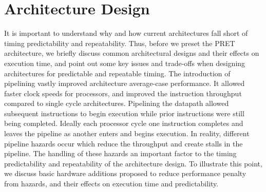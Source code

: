 \section{Architecture Design}
It is important to understand why and how current architectures fall short of timing predictability and repeatability.
Thus, before we preset the PRET architecture, we briefly discuss common architectural designs and their effects on execution time, and point out some key issues and trade-offs when designing architectures for predictable and repeatable timing.
The introduction of pipelining vastly improved architecture average-case performance.
It allowed faster clock speeds for processors, and improved the instruction throughput compared to single cycle architectures.
Pipelining the datapath allowed subsequent instructions to begin execution while prior instructions were still being completed. 
Ideally each processor cycle one instruction completes and leaves the pipeline as another enters and begins execution. 
In reality, different pipeline hazards occur which reduce the throughput and create stalls in the pipeline.
The handling of these hazards an important factor to the timing predictability and repeatability of the architecture design.     
To illustrate this point, we discuss basic hardware additions proposed to reduce performance penalty from hazards, and their effects on execution time and predictability. 
  

